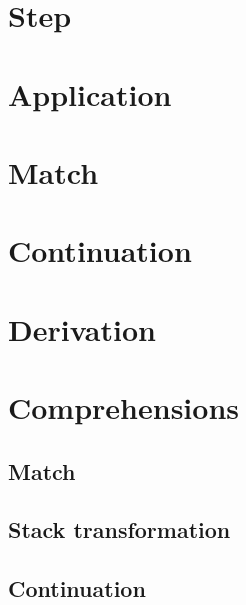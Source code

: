 
\section{Step}



\section{Application}



\section{Match}





\section{Continuation}




\section{Derivation}






\section{Comprehensions}
\subsection{Match}





\subsection{Stack transformation}



\subsection{Continuation}




